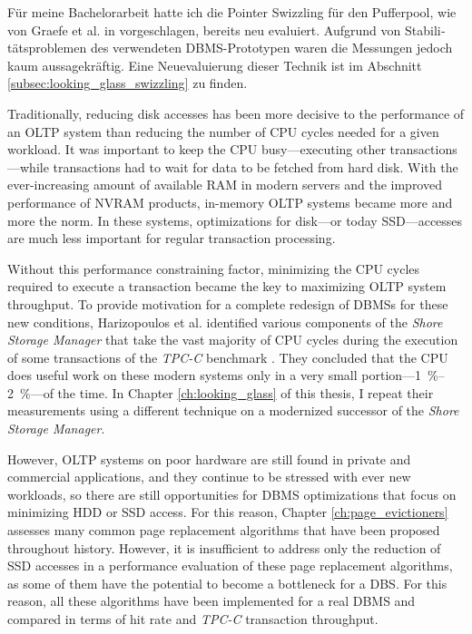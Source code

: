 \begin{otherlanguage}{ngerman}
\begin{myabstract}
        Für meine Bachelorarbeit hatte ich die Pointer Swizzling für den Pufferpool, wie von Graefe et al. in \cite{Graefe:2014} vorgeschlagen, bereits neu evaluiert. Aufgrund von Stabilitätsproblemen des verwendeten DBMS-Prototypen waren die Messungen jedoch kaum aussagekräftig. Eine Neuevaluierung dieser Technik ist im Abschnitt \ref{subsec:looking_glass_swizzling} zu finden.
    \end{myabstract}
\end{otherlanguage}

\begin{myabstract}
    
    Traditionally, reducing disk accesses has been more decisive to the performance of an OLTP system than reducing the number of CPU cycles needed for a given workload. It was important to keep the CPU busy---executing other transactions---while transactions had to wait for data to be fetched from hard disk. With the ever-increasing amount of available RAM in modern servers and the improved performance of NVRAM products, in-memory OLTP systems became more and more the norm. In these systems, optimizations for disk---or today SSD---accesses are much less important for regular transaction processing.
    
    Without this performance constraining factor, minimizing the CPU cycles required to execute a transaction became the key to maximizing OLTP system throughput. To provide motivation for a complete redesign of DBMSs for these new conditions, Harizopoulos et al. identified various components of the \textit{Shore Storage Manager} that take the vast majority of CPU cycles during the execution of some transactions of the \textit{TPC-C} benchmark \cite{Harizopoulos:2008}. They concluded that the CPU does useful work on these modern systems only in a very small portion---\SIrange{1}{2}{\percent}---of the time. In Chapter \ref{ch:looking_glass} of this thesis, I repeat their measurements using a different technique on a modernized successor of the \textit{Shore Storage Manager}.
    
    However, OLTP systems on poor hardware are still found in private and commercial applications, and they continue to be stressed with ever new workloads, so there are still opportunities for DBMS optimizations that focus on minimizing HDD or SSD access. For this reason, Chapter \ref{ch:page_evictioners} assesses many common page replacement algorithms that have been proposed throughout history. However, it is insufficient to address only the reduction of SSD accesses in a performance evaluation of these page replacement algorithms, as some of them have the potential to become a bottleneck for a DBS. For this reason, all these algorithms have been implemented for a real DBMS and compared in terms of hit rate and \textit{TPC-C} transaction throughput.
    

\end{myabstract}
